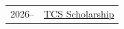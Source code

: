 
\begin{longtable}[l]{@{}p{} p{}}

    2026-- & \href{https://tcs-foundation.or.jp/}{TCS Scholarship} \\

\end{longtable}
